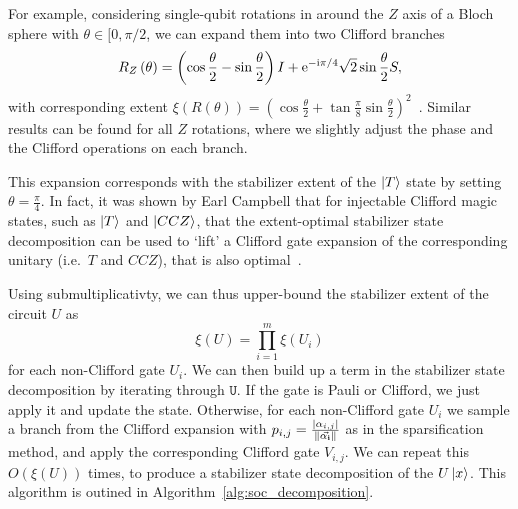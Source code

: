 For example, considering single-qubit rotations in around the $Z$ axis of a Bloch sphere with $\theta\in[0,\pi/2$, we can expand them into two Clifford branches
\begin{equation}
R_{Z}\left(\theta\right) = \left(\cos{\frac{\theta}{2}}-\sin{\frac{\theta}{2}}\right)I + \mathrm{e}^{-\mathrm{i}\pi/4}\sqrt{2}\sin{\frac{\theta}{2}}S,
\label{eq:rotation_expansion}
\end{equation}
with corresponding extent $\xi\left(R\left(\theta\right)\right)=\left(\cos{\frac{\theta}{2}}+\tan{\frac{\pi}{8}}\sin{\frac{\theta}{2}}\right)^{2}$~\cite{Bravyi2018}. Similar results can be found for all $Z$ rotations, where we slightly adjust the phase and the Clifford operations on each branch.\par
This expansion corresponds with the stabilizer extent of the $\ket{T}$ state by setting $\theta=\frac{\pi}{4}$. In fact, it was shown by Earl Campbell that for injectable Clifford magic states, such as $\ket{T}$ and $\ket{CCZ}$, that the extent-optimal stabilizer state decomposition can be used to `lift' a Clifford gate expansion of the corresponding unitary (i.e.\ $T$ and $CCZ$), that is also optimal~\cite{Bravyi2018}.\par
Using submultiplicativty, we can thus upper-bound the stabilizer extent of the circuit $U$ as
\begin{equation}
\xi\left(U\right) = \prod_{i=1}^{m}\xi\left(U_{i}\right)
\end{equation}
for each non-Clifford gate $U_{i}$. We can then build up a term in the stabilizer state decomposition by iterating through $\mathtt{U}$. If the gate is Pauli or Clifford, we just apply it and update the state. Otherwise, for each non-Clifford gate $U_{i}$ we sample a branch from the Clifford expansion with $p_{i,j}=\frac{\left|\alpha_{i,j}\right|}{\norm{\va{\alpha_{i}}}}$ as in the sparsification method, and apply the corresponding Clifford gate $V_{i,j}$. We can repeat this $O(\xi\left(U\right))$ times, to produce a stabilizer state decomposition of the $U\ket{x}$. This algorithm is outined in Algorithm~\ref{alg:soc_decomposition}.\par
